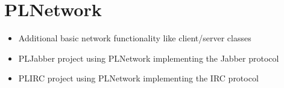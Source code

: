 \chapter{PLNetwork}

\begin{itemize}
\item{Additional basic network functionality like client/server classes}
\item{PLJabber project using PLNetwork implementing the Jabber protocol}
\item{PLIRC project using PLNetwork implementing the IRC protocol}
\end{itemize}
